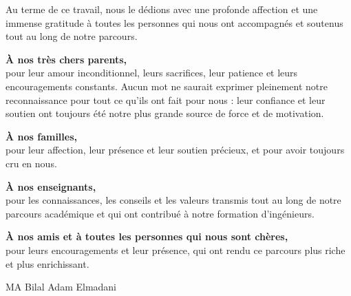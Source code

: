 \itshape

Au terme de ce travail, nous le dédions avec une profonde affection et une immense gratitude à
toutes les personnes qui nous ont accompagnés et soutenus tout au long de notre parcours.

\vspace{0.5em}
\upshape\textbf{À nos très chers parents,}\\
pour leur amour inconditionnel, leurs sacrifices, leur patience et leurs encouragements constants.
Aucun mot ne saurait exprimer pleinement notre reconnaissance pour tout ce qu'ils ont fait pour
nous : leur confiance et leur soutien ont toujours été notre plus grande source de force et de
motivation.

\vspace{0.5em}
\upshape\textbf{À nos familles,}\\
pour leur affection, leur présence et leur soutien précieux, et pour avoir toujours cru en nous.

\vspace{0.5em}
\upshape\textbf{À nos enseignants,}\\
pour les connaissances, les conseils et les valeurs transmis tout au long de notre parcours
académique et qui ont contribué à notre formation d'ingénieurs.

\vspace{0.5em}
\upshape\textbf{À nos amis et à toutes les personnes qui nous sont chères,}\\
pour leurs encouragements et leur présence, qui ont rendu ce parcours plus riche et plus
enrichissant.

\vspace{1.2em}
\begin{flushright}
MA Bilal \quad\textbullet\quad Adam Elmadani
\end{flushright}

